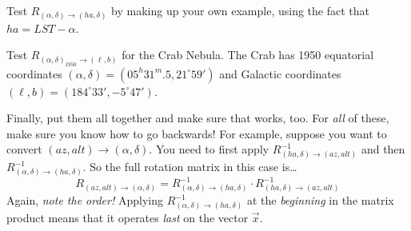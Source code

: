 \documentclass[]{article}
\begin{document}
    Test ${R}_{(\alpha, \delta) \rightarrow (ha, \delta)}$ by
making up your own example, using the fact that $ha = LST - \alpha$. 

    Test ${R}_{(\alpha, \delta)_{1950} \rightarrow (\ell, b)}$
for the Crab Nebula. The Crab has 1950
equatorial coordinates $(\alpha, \delta)=(05^h31^m.5, 21^\circ59')$ and
Galactic coordinates $(\ell,b)=(184^\circ33', -5^\circ47')$.

    Finally, put them all together and make sure that works, too. 
For {\it all} of these, make sure you know how to go backwards! For
example, suppose you want to convert $(az, alt) \rightarrow (\alpha,
\delta)$.  You need to first apply ${R}_{(ha, \delta) \rightarrow
(az, alt)}^{-1}$ and then ${R}_{(\alpha, \delta) \rightarrow (ha,
\delta)}^{-1}$.  So the full rotation matrix in this case is\dots
\begin{equation}
{R}_{(az, alt) \rightarrow (\alpha, \delta)} = 
{R}_{(\alpha, \delta) \rightarrow (ha, \delta)}^{-1} \cdot
{R}_{(ha, \delta) \rightarrow (az, alt)}^{-1}
\end{equation}
\noindent Again, {\it note the order!} Applying ${R}_{(\alpha,
\delta) \rightarrow (ha, \delta)}^{-1}$ at the {\it beginning} in the
matrix product means that it operates {\it last} on the vector ${\vec x}$. 

%
%
\end{document}
